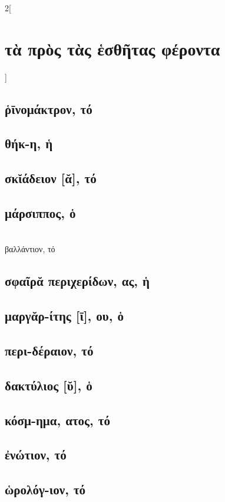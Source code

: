 \documentclass{book}
\begin{document}
\begin{multicols}{2}[\section{τὰ πρὸς τὰς ἑσθῆτας φέροντα}]
\subsection{ῥῑνομάκτρον, τό}
\subsection{θήκ-η, ἡ}
\subsection{σκῐάδειον [ᾰ], τό}
\subsection{μάρσιππος, ὁ}  ~\\
βαλλάντιον, τό 
\subsection{σφαῖρᾰ περιχερίδων, ας, ἡ}         
\subsection{μαργᾰρ-ίτης [ῑ], ου, ὁ}
\subsection{περι-δέραιον, τό} 
\subsection{δακτύλιος [ῠ], ὁ}
\subsection{κόσμ-ημα, ατος, τό}
\subsection{ἐνώτιον, τό}
\subsection{ὡρολόγ-ιον, τό}

\end{multicols}
\end{document}
